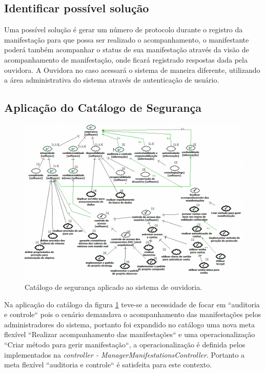 \subsection{Identificar possível solução}

Uma possível solução é gerar um número de protocolo durante o registro da manifestação para que possa ser realizado o acompanhamento, o manifestante poderá também acompanhar o status de sua manifestação através da visão de acompanhamento de manifestação, onde ficará registrado respostas dada pela ouvidora.
A Ouvidora no caso acessará o sistema de maneira diferente, utilizando a área administrativa do sistema através de autenticação de usuário. 


\subsection{Aplicação do Catálogo de Segurança}

\begin{figure}[h!]
	\centering
	\includegraphics[keepaspectratio=true,scale=0.65]{figuras/catalogoPersona2.PNG}
	\caption{Catálogo de segurança aplicado ao sistema de ouvidoria.}
	\label{catalogoPersona2}
\end{figure}

Na aplicação do catálogo da figura \ref{catalogoPersona2} teve-se a necessidade de focar em ``auditoria e controle`` pois o cenário demandava  o acompanhamento das manifestações pelos administradores do sistema, portanto foi expandido no catálogo uma nova meta flexível ``Realizar acompanhamento das manifestações`` e uma operacionalização ``Criar método para gerir manifestação``, a operacionalização é definida pelos implementados na \textit{controller - ManagerManifestationsController}. Portanto a meta flexível ``auditoria e controle`` é satisfeita para este contexto.

